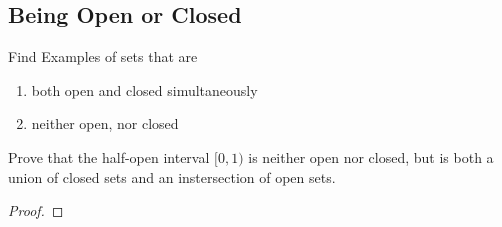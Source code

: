 \subsection{Being Open or Closed}
\begin{majorEx} %
  Find Examples of sets that are 
  \begin{enumerate}
  \item both open and closed simultaneously
  \item neither open, nor closed
  \end{enumerate}
\end{majorEx}

\begin{minorEx} %
\end{minorEx}

\begin{majorEx} %
\end{majorEx}

\begin{minorEx} %
  Prove that the half-open interval $[0,1)$  is neither open nor
  closed, but is both a union of closed sets and an instersection of
  open sets.
\end{minorEx}
\begin{proof}
\end{proof}

\begin{minorEx} %
\end{minorEx}